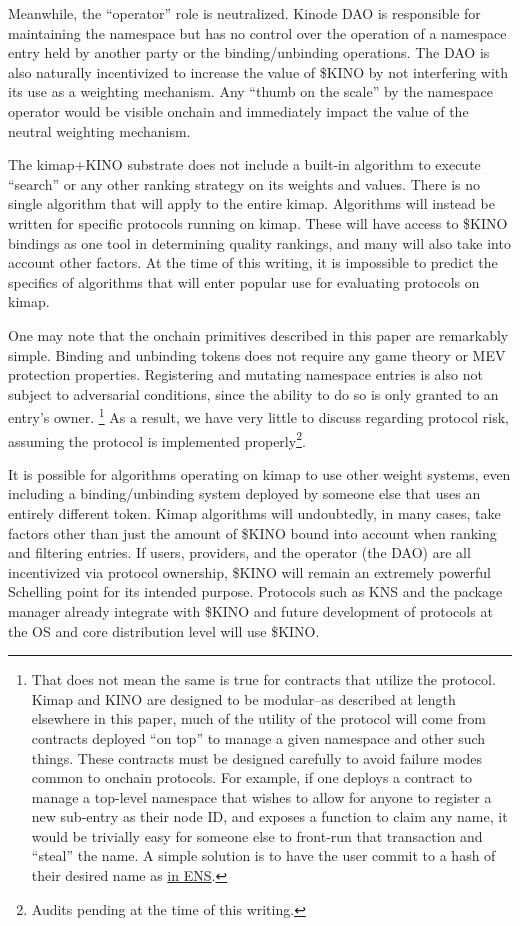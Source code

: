 \documentclass[runningheads]{llncs}
\begin{document}
Meanwhile, the ``operator'' role is neutralized.
Kinode DAO is responsible for maintaining the namespace but has no control over the operation of a namespace entry held by another party or the binding/unbinding operations.
The DAO is also naturally incentivized to increase the value of \$KINO by not interfering with its use as a weighting mechanism.
Any ``thumb on the scale'' by the namespace operator would be visible onchain and immediately impact the value of the neutral weighting mechanism.

The kimap+KINO substrate does not include a built-in algorithm to execute ``search'' or any other ranking strategy on its weights and values.
There is no single algorithm that will apply to the entire kimap.
Algorithms will instead be written for specific protocols running on kimap.
These will have access to \$KINO bindings as one tool in determining quality rankings, and many will also take into account other factors.
At the time of this writing, it is impossible to predict the specifics of algorithms that will enter popular use for evaluating protocols on kimap.

One may note that the onchain primitives described in this paper are remarkably simple.
Binding and unbinding tokens does not require any game theory or MEV protection properties.
Registering and mutating namespace entries is also not subject to adversarial conditions, since the ability to do so is only granted to an entry's owner.
\footnote{That does not mean the same is true for contracts that utilize the protocol.
Kimap and KINO are designed to be modular–as described at length elsewhere in this paper, much of the utility of the protocol will come from contracts deployed ``on top'' to manage a given namespace and other such things.
These contracts must be designed carefully to avoid failure modes common to onchain protocols.
For example, if one deploys a contract to manage a top-level namespace that wishes to allow for anyone to register a new sub-entry as their node ID, and exposes a function to claim any name, it would be trivially easy for someone else to front-run that transaction and ``steal'' the name.
A simple solution is to have the user commit to a hash of their desired name as \href{https://docs.ens.domains/registry/eth\#commit-reveal}{in ENS}.}
As a result, we have very little to discuss regarding protocol risk, assuming the protocol is implemented properly\footnote{Audits pending at the time of this writing.}.

It is possible for algorithms operating on kimap to use other weight systems, even including a binding/unbinding system deployed by someone else that uses an entirely different token.
Kimap algorithms will undoubtedly, in many cases, take factors other than just the amount of \$KINO bound into account when ranking and filtering entries.
If users, providers, and the operator (the DAO) are all incentivized via protocol ownership, \$KINO will remain an extremely powerful Schelling point for its intended purpose.
Protocols such as KNS and the package manager already integrate with \$KINO and future development of protocols at the OS and core distribution level will use \$KINO.
\end{document}

